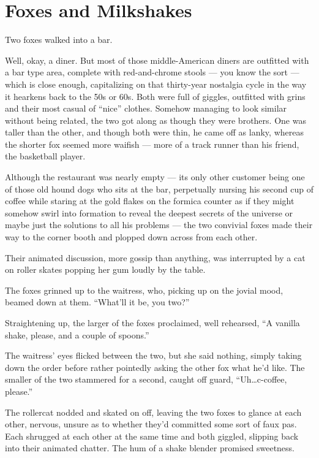 \chapter{Foxes and Milkshakes}

Two foxes walked into a bar.

Well, okay, a diner. But most of those middle-American diners are outfitted with a bar type area, complete with red-and-chrome stools --- you know the sort --- which is close enough, capitalizing on that thirty-year nostalgia cycle in the way it hearkens back to the 50s or 60s. Both were full of giggles, outfitted with grins and their most casual of ``nice'' clothes. Somehow managing to look similar without being related, the two got along as though they were brothers. One was taller than the other, and though both were thin, he came off as lanky, whereas the shorter fox seemed more waifish --- more of a track runner than his friend, the basketball player.

Although the restaurant was nearly empty --- its only other customer being one of those old hound dogs who sits at the bar, perpetually nursing his second cup of coffee while staring at the gold flakes on the formica counter as if they might somehow swirl into formation to reveal the deepest secrets of the universe or maybe just the solutions to all his problems --- the two convivial foxes made their way to the corner booth and plopped down across from each other.

Their animated discussion, more gossip than anything, was interrupted by a cat on roller skates popping her gum loudly by the table.

The foxes grinned up to the waitress, who, picking up on the jovial mood, beamed down at them. ``What'll it be, you two?''

Straightening up, the larger of the foxes proclaimed, well rehearsed, ``A vanilla shake, please, and a couple of spoons.''

The waitress' eyes flicked between the two, but she said nothing, simply taking down the order before rather pointedly asking the other fox what he'd like. The smaller of the two stammered for a second, caught off guard, ``Uh\ldots c-coffee, please.''

The rollercat nodded and skated on off, leaving the two foxes to glance at each other, nervous, unsure as to whether they'd committed some sort of faux pas. Each shrugged at each other at the same time and both giggled, slipping back into their animated chatter. The hum of a shake blender promised sweetness.

